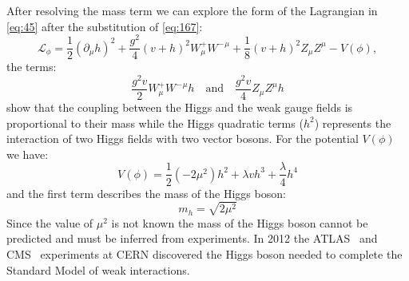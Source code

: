 After resolving the mass term we can explore the form of the Lagrangian in
\cref{eq:45} after the substitution of \cref{eq:167}:
\begin{equation}
  \label{eq:174}
  \mathcal{L}_\phi = \frac{1}{2} \left( \partial_\mu h \right)^2 +
  \frac{g^2}{4}(v + h)^2 W_\mu^+ {W^-}^\mu + \frac{1}{8}(v + h)^2 Z_\mu Z^\mu -
  V(\phi),
\end{equation}
the terms:
\begin{equation}
  \label{eq:175}
  \frac{g^2v}{2} W_\mu^+ {W^-}^\mu h \quad \mathrm{and} \quad \frac{g^2v}{4}
  Z_\mu Z^\mu h
\end{equation}
show that the coupling between the Higgs and the weak gauge fields is
proportional to their mass while the Higgs quadratic terms ($h^2$) represents
the interaction of two Higgs fields with two vector bosons. For the potential
$V(\phi)$ we have:
\begin{equation}
  \label{eq:172}
  V(\phi) = \frac{1}{2} (- 2 \mu^2) h^2 + \lambda v h^3 + \frac{\lambda}{4} h^4
\end{equation}
and the first term describes the mass of the Higgs boson:
\begin{equation}
  \label{eq:173}
  m_h = \sqrt{2 \mu^2}
\end{equation}
Since the value of $\mu^2$ is not known the mass of the Higgs boson cannot be
predicted and must be inferred from experiments. In 2012 the
ATLAS~\cite{ATLASHiggs} and CMS~\cite{CMSHiggs} experiments at CERN discovered
the Higgs boson needed to complete the Standard Model of weak interactions.
